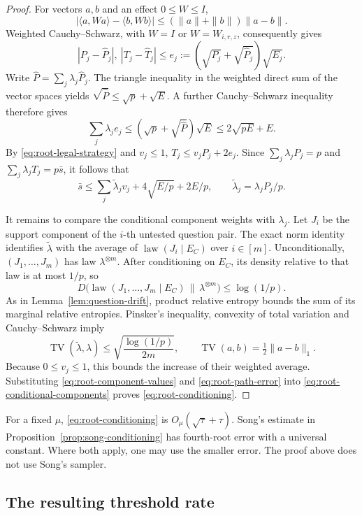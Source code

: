 \begin{proof}
For vectors $a,b$ and an effect $0\le W\le I$,
\[
 |\langle a,Wa\rangle-\langle b,Wb\rangle|
       \le(\|a\|+\|b\|)\|a-b\|.
\]
Weighted Cauchy--Schwarz, with $W=I$ or $W=W_{i,r,z}$, consequently
gives
\[
 |P_j-\widehat P_j|,\ |T_j-\widehat T_j|
 \le e_j:=(\sqrt{P_j}+\sqrt{\widehat P_j})\sqrt{E_j}.
\]
Write $\widehat P=\sum_j\lambda_j\widehat P_j$. The triangle
inequality in the weighted direct sum of the vector spaces yields
$\sqrt{\widehat P}\le\sqrt p+\sqrt E$. A further Cauchy--Schwarz
inequality therefore gives
\[
 \sum_j\lambda_je_j
 \le(\sqrt p+\sqrt{\widehat P})\sqrt E
 \le2\sqrt{pE}+E.
\]
By \eqref{eq:root-legal-strategy} and $v_j\le1$,
$T_j\le v_jP_j+2e_j$. Since
$\sum_j\lambda_jP_j=p$ and $\sum_j\lambda_jT_j=p\bar s$, it follows
that
\begin{equation}\label{eq:root-conditional-components}
 \bar s\le\sum_j\widetilde\lambda_jv_j
                      +4\sqrt{E/p}+2E/p,
 \qquad\widetilde\lambda_j=\lambda_jP_j/p.
\end{equation}

It remains to compare the conditional component weights with
$\lambda_j$. Let $J_i$ be the support component of the $i$-th untested
question pair. The exact norm identity identifies
$\widetilde\lambda$ with the average of
$\operatorname{law}(J_i\mid E_C)$ over $i\in[m]$. Unconditionally,
$(J_1,\ldots,J_m)$ has law $\lambda^{\otimes m}$. After conditioning
on $E_C$, its density relative to that law is at most $1/p$, so
\[
 D\bigl(\operatorname{law}(J_1,\ldots,J_m\mid E_C)
                      \,\|\,\lambda^{\otimes m}\bigr)\le\log(1/p).
\]
As in Lemma~\ref{lem:question-drift}, product relative entropy bounds
the sum of its marginal relative entropies. Pinsker's inequality,
convexity of total variation and Cauchy--Schwarz imply
\[
 \operatorname{TV}(\widetilde\lambda,\lambda)
       \le\sqrt{\frac{\log(1/p)}{2m}},
 \qquad \operatorname{TV}(a,b)=\tfrac12\|a-b\|_1.
\]
Because $0\le v_j\le1$, this bounds the increase of their weighted
average. Substituting \eqref{eq:root-component-values} and
\eqref{eq:root-path-error} into
\eqref{eq:root-conditional-components} proves
\eqref{eq:root-conditioning}.
\end{proof}

For a fixed $\mu$, \eqref{eq:root-conditioning} is
$O_\mu(\sqrt\tau+\tau)$. Song's estimate in
Proposition~\ref{prop:song-conditioning} has fourth-root error with a
universal constant. Where both apply, one may use the smaller error.
The proof above does not use Song's sampler.

\subsection{The resulting threshold rate}

